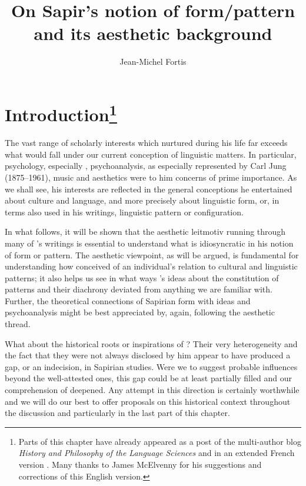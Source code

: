 \documentclass[output=paper]{langscibook}
\author{Jean-Michel Fortis\affiliation{\textsc{cnrs}, Université Paris Diderot}}
\title{On Sapir's notion of form/pattern and its aesthetic background}
\begin{document}
\maketitle

\section{Introduction\protect\footnote{Parts of this chapter have already appeared as a post of the multi-author blog \emph{History and Philosophy of the Language Sciences} \citep{Fortis2014} and in an extended French version \citep{Fortis2015}. Many thanks to James McElvenny for his suggestions and corrections of this English version. }}
\label{sec:fotis:intro}

The vast range of scholarly interests which {\Sapir} nurtured during his life far exceeds what would fall under our current conception of linguistic matters. In particular, psychology, especially , psychoanalysis, as especially represented by Carl Jung (1875--1961), music and aesthetics were to him concerns of prime importance. As we shall see, his interests are reflected in the general conceptions he entertained about culture and language, and more precisely about linguistic form, or, in terms also used in his writings, linguistic pattern or configuration.

In what follows, it will be shown that the aesthetic leitmotiv running  through many of {\Sapir}'s writings is essential to understand what is idiosyncratic in his notion of form or pattern. The aesthetic viewpoint, as will be argued, is fundamental for understanding how {\Sapir} conceived of an individual's relation to cultural and linguistic patterns; it also helps us see in what ways {\Sapir}'s ideas about the constitution of patterns and their diachrony deviated from anything we are familiar with. Further, the theoretical connections of Sapirian form with  ideas and psychoanalysis might be best appreciated by, again, following the aesthetic thread.

What about the historical roots or inspirations of {\Sapir}? Their very heterogeneity and the fact that they were not always disclosed by him appear to have produced a gap, or an indecision, in Sapirian studies. Were we to suggest probable influences beyond the well-attested ones, this gap could be at least partially filled and our comprehension of {\Sapir} deepened. Any attempt in this direction is certainly worthwhile and we will do our best to offer proposals on this historical context throughout the discussion and particularly in the last part of this chapter.
\end{document}
